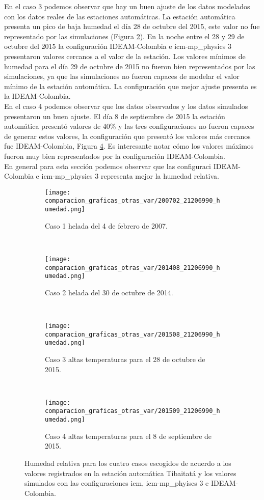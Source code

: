 En el caso 3 podemos observar que hay un buen ajuste de los datos modelados con los datos reales de las estaciones automáticas. La estación automática presenta un pico de baja humedad el día 28 de octubre del 2015, este valor no fue representado por las simulaciones (Figura \ref{caso2_tiba_wrf_hum}). En la noche entre el 28 y 29 de octubre del 2015 la configuración IDEAM-Colombia e icm-mp\_physics 3 presentaron valores cercanos a el valor de la estación. Los valores mínimos de humedad para el día 29 de octubre de 2015 no fueron bien representados por las simulaciones, ya que las simulaciones no fueron capaces de modelar el valor mínimo de la estación automática. La configuración que mejor ajuste presenta es la IDEAM-Colombia.\\

En el caso 4 podemos observar que los datos observados y los datos simulados presentaron un buen ajuste. El día 8 de septiembre de 2015 la estación automática presentó valores de 40\% y las tres configuraciones no fueron capaces de generar estos valores, la configuración que presentó los valores más cercanos fue IDEAM-Colombia, Figura \ref{caso4_tiba_wrf_hum}. Es interesante notar cómo los valores máximos fueron muy bien representados por la configuración IDEAM-Colombia.\\

En general para esta sección podemos observar que las configuraci IDEAM-Colombia e icm-mp\_physics 3 representa mejor la humedad relativa.


\begin{figure}[H]

\begin{subfigure}[normla]{0.4\textwidth}
\caption{Caso 1 helada del 4 de febrero de 2007.}
\label{caso1_tiba_wrf_hum}
\texttt{[image: comparacion\_graficas\_otras\_var/200702\_21206990\_humedad.png]}
\end{subfigure}
~
\begin{subfigure}[normla]{0.4\textwidth}
\caption{Caso 2 helada del 30 de octubre de 2014.}
\label{caso2_tiba_wrf_hum}
\texttt{[image: comparacion\_graficas\_otras\_var/201408\_21206990\_humedad.png]}
\end{subfigure}
~
\centering
\begin{subfigure}[normla]{0.4\textwidth}
\caption{Caso 3 altas temperaturas para el 28 de octubre de 2015.}
\label{caso3_tiba_wrf_hum}
\texttt{[image: comparacion\_graficas\_otras\_var/201508\_21206990\_humedad.png]}
\end{subfigure}
~
\centering
\begin{subfigure}[normla]{0.4\textwidth}
\caption{Caso 4 altas temperaturas para el 8 de septiembre de 2015.}
\label{caso4_tiba_wrf_hum}
\texttt{[image: comparacion\_graficas\_otras\_var/201509\_21206990\_humedad.png]}
\end{subfigure}

    \caption{Humedad relativa para los cuatro casos escogidos de acuerdo a los valores registrados en la  estación automática Tibaitatá y los valores simulados con las configuraciones icm, icm-mp\_phyiscs 3 e IDEAM-Colombia.}
    \label{fig:wrf_hum_tibaitata}
\end{figure}


